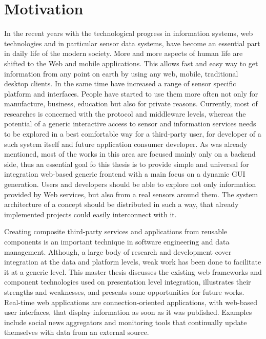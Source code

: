 \section{Motivation}
     In the recent years with the technological progress in information systems, web technologies and in particular sensor data systems, have become an essential part in daily life of the modern society. More and more aspects of human life are shifted to the Web and mobile applications. This allows fast and easy way to get information from any point on earth by using any web, mobile, traditional desktop clients. In the same time have increased a range of sensor specific platform and interfaces. People have started to use them more often not only for manufacture, business, education but also for private reasons. Currently, most of researches is concerned with the protocol and middleware levels, whereas the potential of a generic interactive access to sensor and information services needs to be explored in a best comfortable way for a third-party user, for developer of a such system itself and future application consumer developer. As was already mentioned, most of the works in this area are focused mainly only on a backend side, thus an essential goal fo this thesis is to provide simple and universal for integration web-based generic frontend with a main focus on a dynamic GUI generation. Users and developers should be able to explore not only information provided by Web services, but also from a real sensors around them. The system architecture of a concept should be distributed in such a way, that already implemented projects could easily interconnect with it.

     Creating composite third-party services and applications from reusable components is an important technique in software engineering and data management. Although, a large body of research and development cover integration at the data and platform levels, weak work has been done to facilitate it at a generic level. This master thesis discusses the existing web frameworks and component technologies used on presentation level integration, illustrates their strengths and weaknesses, and presents some opportunities for future works. Real-time web applications are connection-oriented applications, with web-based user interfaces, that display information as soon as it was published. Examples include social news aggregators and monitoring tools that continually update themselves with data from an external source.

